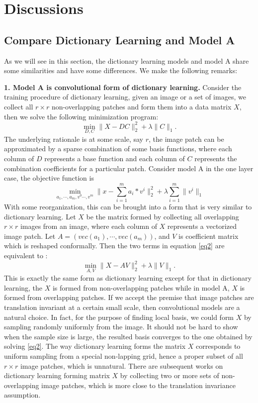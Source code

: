 \documentclass[a4paper]{article}
\begin{document}
\section{Discussions}
\subsection{Compare Dictionary Learning and Model A}
As we will see in this section, the dictionary learning models and model A share some similarities and have some differences. We make the following remarks: 

\textbf{1. Model A is convolutional form of dictionary learning.} Consider the training procedure of dictionary learning, given an image or a set of images, we collect all $r\times r$ non-overlapping patches and form them into a data matrix $X$, then we solve the following minimization program:
\begin{equation}
	\min_{D,C} \|X-DC\|_2^2 + \lambda\|C\|_1.
\end{equation}
The underlying rationale is at some scale, say $r$, the image patch can be approximated by a sparse combination of some basis functions, where each column of $D$ represents a base function and each column of $C$ represents the combination coefficients for a particular patch.
Consider model A in the one layer case, the objective function is 
\begin{equation}
\label{eq2}
	\min_{a_1,\cdots,a_m,v^{0}\cdots ,v^{m}} \|x-\sum_{i=1}^{m} a_i*v^{i}\|_2^2 +\lambda \sum_{i=1}^{m} \|v^{i}\|_1
\end{equation}
With some reorganization, this can be brought into a form that is very similar to dictionary learning. Let $X$ be the matrix formed by collecting all overlapping $r\times r$ images from an image, where each column of $X$ represents a vectorized image patch. Let $A=(vec(a_1),\cdots, vec(a_m))$, and $V$ is coefficient matrix which is reshaped conformally. Then the two terms in equation \eqref{eq2} are equivalent to :
\begin{equation}
	\min_{A,V} \|X-AV\|_2^2+\lambda \|V\|_1.
\end{equation}
This is exactly the same form as dictionary learning except for that in dictionary learning, the $X$ is formed from non-overlapping patches while in model A, $X$ is formed from overlapping patches. If we accept the premise that image patches are translation invariant at a certain small scale, then convolutional models are a natural choice. In fact, for the purpose of finding local basis, we could form $X$ by sampling randomly uniformly from the image. It should not be hard to show when the sample size is large, the resulted basis converges to the one obtained by solving \eqref{eq2}. The way dictionary learning forms the matrix $X$ corresponds to uniform sampling from a special non-lapping grid, hence a proper subset of all $r\times r$ image patches, which is unnatural. There are subsequent works on dictionary learning forming matrix $X$ by collecting two or more sets of non-overlapping image patches, which is more close to the translation invariance assumption.
\end{document}

